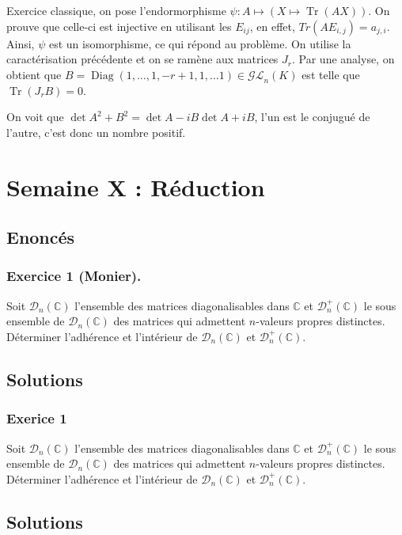 \documentclass{article}
\DeclareMathOperator{\Tr}{Tr}
\DeclareMathOperator{\diag}{Diag}
\begin{document}
	Exercice classique, on pose l'endormorphisme $\psi : A \mapsto (X\mapsto \Tr(AX))$. On prouve que celle-ci est injective en utilisant les $E_{ij}$, en effet, $Tr(AE_{i,j}) = a_{j,i}$. Ainsi, $\psi$ est un isomorphisme, ce qui répond au problème. On utilise la caractérisation précédente et on se ramène aux matrices $J_r$. Par une analyse, on obtient que $B = \diag(1, \ldots, 1, -r+1, 1, \ldots 1)\in\mathcal{GL}_n(K)$ est telle que $\Tr(J_rB) = 0$. 

	On voit que $\det A^2 + B^2 = \det A-iB \det A+iB$, l'un est le conjugué de l'autre, c'est donc un nombre positif.
	\section{Semaine X : Réduction}
	\subsection*{Enoncés}
	\subsubsection*{Exercice 1 (Monier).}
	Soit $\mathcal{D}_n(\mathbb{C})$ l'ensemble des matrices diagonalisables dans $\mathbb{C}$ et $\mathcal{D}_n^+(\mathbb{C})$ le sous ensemble de $\mathcal{D}_n(\mathbb{C})$ des matrices qui admettent $n$-valeurs propres distinctes. Déterminer l'adhérence et l'intérieur de $\mathcal{D}_n(\mathbb{C})$ et $\mathcal{D}_n^+(\mathbb{C})$.
	\subsection*{Solutions}
	\subsubsection*{Exerice 1}
        
	Soit $\mathcal{D}_n(\mathbb{C})$ l'ensemble des matrices diagonalisables dans $\mathbb{C}$ et $\mathcal{D}_n^+(\mathbb{C})$ le sous ensemble de $\mathcal{D}_n(\mathbb{C})$ des matrices qui admettent $n$-valeurs propres distinctes. Déterminer l'adhérence et l'intérieur de $\mathcal{D}_n(\mathbb{C})$ et $\mathcal{D}_n^+(\mathbb{C})$.
	\subsection*{Solutions}
        
\end{document}
